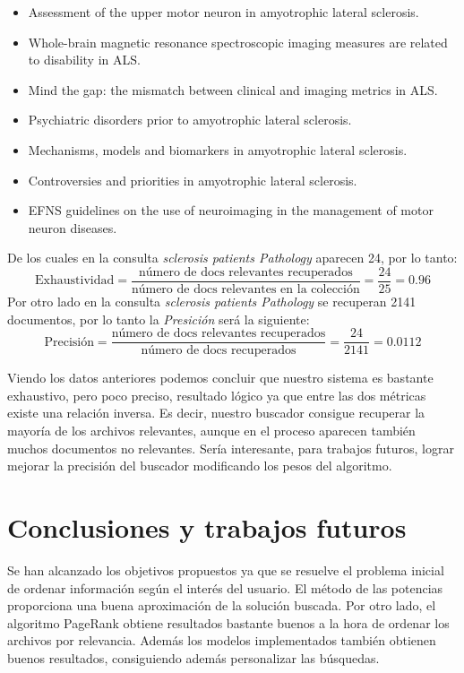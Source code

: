 \documentclass[size=a4, parskip=half, titlepage=false, toc=flat, toc=bib, 12pt, twoside]{scrartcl}
\theoremstyle{theorem-style}
\theoremstyle{definition-style}
\theoremstyle{remark-style}
\theoremstyle{example-style}
\theoremstyle{definition-style}
\theoremstyle{remark-style}
\begin{document}
\begin{itemize}
\item Assessment of the upper motor neuron in amyotrophic lateral sclerosis.
\item Whole-brain magnetic resonance spectroscopic imaging measures are related to disability in ALS.
\item Mind the gap: the mismatch between clinical and imaging metrics in ALS.
\item Psychiatric disorders prior to amyotrophic lateral sclerosis.
\item Mechanisms, models and biomarkers in amyotrophic lateral sclerosis.
\item Controversies and priorities in amyotrophic lateral sclerosis.
\item EFNS guidelines on the use of neuroimaging in the management of motor neuron diseases.
\end{itemize}

De los cuales en la consulta \textit{sclerosis patients Pathology} aparecen 24, por lo tanto:
$$\textrm{Exhaustividad} = \frac{\textrm{número de docs relevantes recuperados}}{\textrm{número de docs relevantes en la colección}} = \frac{24}{25} = 0.96 $$
Por otro lado en la consulta \textit{sclerosis patients Pathology} se recuperan 2141 documentos, por lo tanto la \textit{Presición} será la siguiente:
$$\textrm{Precisión} = \frac{\textrm{número de docs relevantes recuperados}}{\textrm{número de docs recuperados}} = \frac{24}{2141} = 0.0112$$

Viendo los datos anteriores podemos concluir que nuestro sistema es bastante exhaustivo, pero poco preciso, resultado lógico ya que entre las dos métricas existe una relación inversa. Es decir, nuestro buscador consigue recuperar la mayoría de los archivos relevantes, aunque en el proceso aparecen también muchos documentos no relevantes. Sería interesante, para trabajos futuros, lograr mejorar la precisión del buscador modificando los pesos del algoritmo.

\newpage
\section{Conclusiones y trabajos futuros}
Se han alcanzado los objetivos propuestos ya que se resuelve el problema inicial de ordenar información según el interés del usuario. El método de las potencias proporciona una buena aproximación de la solución buscada.
Por otro lado, el algoritmo PageRank obtiene resultados bastante buenos a la hora de ordenar los archivos por relevancia. Además los modelos implementados también obtienen buenos resultados, consiguiendo además personalizar las búsquedas.
\end{document}
